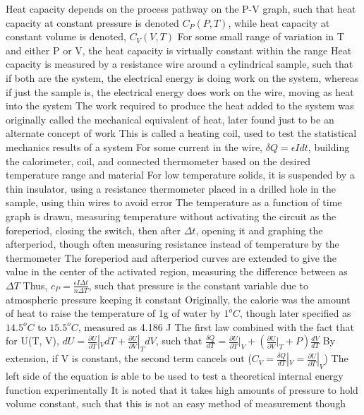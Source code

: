 \begin{outline*}
\2 Heat capacity depends on the process pathway on the P-V graph, such that heat capacity at constant pressure is denoted $C_P(P, T)$, while heat capacity at constant volume is denoted, $C_V(V, T)$
\3 For some small range of variation in T and either P or V, the heat capacity is virtually constant within the range
\2 Heat capacity is measured by a resistance wire around a cylindrical sample, such that if both are the system, the electrical energy is doing work on the system, whereas if just the sample is, the electrical energy does work on the wire, moving as heat into the system
\3 The work required to produce the heat added to the system was originally called the mechanical equivalent of heat, later found just to be an alternate concept of work
\3 This is called a heating coil, used to test the statistical mechanics results of a system
\3 For some current in the wire, $\delta Q = \epsilon I dt$, building the calorimeter, coil, and connected thermometer based on the desired temperature range and material
\4 For low temperature  solids, it is suspended by a thin insulator, using a resistance thermometer placed in a drilled hole in the sample, using thin wires to avoid error
\3 The temperature as a function of time graph is drawn, measuring temperature without activating the circuit as the foreperiod, closing the switch, then after $\Delta t$, opening it and graphing the afterperiod, though often measuring resistance instead of temperature by the thermometer
\4 The foreperiod and afterperiod curves are extended to give the value in the center of the activated region, measuring the difference between as $\Delta T$
\4 Thus, $c_P = \frac{\epsilon I \Delta t}{n \Delta T}$, such that pressure is the constant variable due to atmospheric pressure keeping it constant
\2 Originally, the calorie was the amount of heat to raise the temperature of 1g of water by $1^o C$, though later specified as $14.5^o C$ to $15.5^o C$, measured as 4.186 J
\1 The first law combined with the fact that for U(T, V), $dU = \frac{\partial U}{\partial T}|_VdT + \frac{\partial U}{\partial V}|_TdV$, such that $\frac{\delta Q}{dT} = \frac{\partial U}{\partial T}|_V + (\frac{\partial U}{\partial V}|_T + P)\frac{dV}{dT}$
\2 By extension, if V is constant, the second term cancels out ($C_V = \frac{\delta Q}{dT}|_V = \frac{\partial U}{\partial T}|_V$)
\3 The left side of the equation is able to be used to test a theoretical internal energy function experimentally
\3 It is noted that it takes high amounts of pressure to hold volume constant, such that this is not an easy method of measurement though

\end{outline*}
